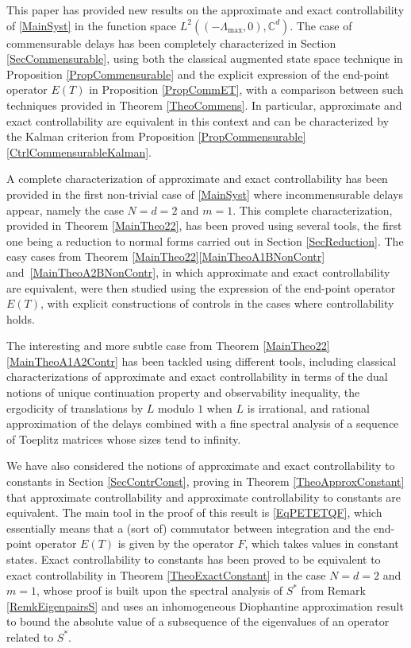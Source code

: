 \documentclass[JEP,XML,SOM,Unicode]{cedram}
\theoremstyle{plain}
\theoremstyle{definition}
\begin{document}
This paper has provided new results on the approximate and exact controllability of \eqref{MainSyst} in the function space $L^2((-\Lambda_{\max}, 0), \mathbb C^d)$. The case of commensurable delays has been completely characterized in Section \ref{SecCommensurable}, using both the classical augmented state space technique in Proposition \ref{PropCommensurable} and the explicit expression of the end-point operator $E(T)$ in Proposition \ref{PropCommET}, with a comparison between such techniques provided in Theorem \ref{TheoCommens}. In particular, approximate and exact controllability are equivalent in this context and can be characterized by the Kalman criterion from Proposition \ref{PropCommensurable}\eqref{CtrlCommensurableKalman}.

A complete characterization of approximate and exact controllability has been provided in the first non-trivial case of \eqref{MainSyst} where incommensurable delays appear, namely the case $N = d = 2$ and $m = 1$. This complete characterization, provided in Theorem \ref{MainTheo22}, has been proved using several tools, the first one being a reduction to normal forms carried out in Section \ref{SecReduction}. The easy cases from Theorem \ref{MainTheo22}\eqref{MainTheoA1BNonContr} and~\eqref{MainTheoA2BNonContr}, in which approximate and exact controllability are equivalent, were then studied using the expression of the end-point operator $E(T)$, with explicit constructions of controls in the cases where controllability holds.

The interesting and more subtle case from Theorem \ref{MainTheo22}\eqref{MainTheoA1A2Contr} has been tackled using different tools, including classical characterizations of approximate and exact controllability in terms of the dual notions of unique continuation property and observability inequality, the ergodicity of translations by $L$ modulo $1$ when $L$ is irrational, and rational approximation of the delays combined with a fine spectral analysis of a sequence of Toeplitz matrices whose sizes tend to infinity.

We have also considered the notions of approximate and exact controllability to constants in Section \ref{SecContrConst}, proving in Theorem \ref{TheoApproxConstant} that approximate controllability and approximate controllability to constants are equivalent. The main tool in the proof of this result is \eqref{EqPETETQF}, which essentially means that a (sort of) commutator between integration and the end-point operator $E(T)$ is given by the operator $F$, which takes values in constant states. Exact controllability to constants has been proved to be equivalent to exact controllability in Theorem \ref{TheoExactConstant} in the case $N = d = 2$ and $m = 1$, whose proof is built upon the spectral analysis of $S^\ast$ from Remark \ref{RemkEigenpairsS} and uses an inhomogeneous Diophantine approximation result to bound the absolute value of a subsequence of the eigenvalues of an operator related to $S^\ast$.
\end{document}
